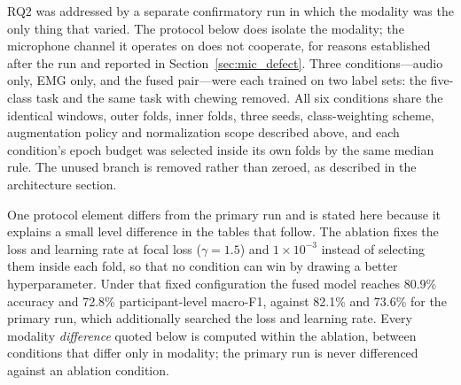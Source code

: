 \documentclass[pdflatex,sn-nature,iicol]{sn-jnl}
\begin{document}
RQ2 was addressed by a separate confirmatory run in which the modality was the only thing that varied. The protocol below does isolate the modality; the microphone channel it operates on does not cooperate, for reasons established after the run and reported in Section~\ref{sec:mic_defect}. Three conditions---audio only, EMG only, and the fused pair---were each trained on two label sets: the five-class task and the same task with chewing removed. All six conditions share the identical windows, outer folds, inner folds, three seeds, class-weighting scheme, augmentation policy and normalization scope described above, and each condition's epoch budget was selected inside its own folds by the same median rule. The unused branch is removed rather than zeroed, as described in the architecture section.

One protocol element differs from the primary run and is stated here because it explains a small level difference in the tables that follow. The ablation fixes the loss and learning rate at focal loss ($\gamma = 1.5$) and $1\times10^{-3}$ instead of selecting them inside each fold, so that no condition can win by drawing a better hyperparameter. Under that fixed configuration the fused model reaches 80.9\% accuracy and 72.8\% participant-level macro-F1, against 82.1\% and 73.6\% for the primary run, which additionally searched the loss and learning rate. Every modality \emph{difference} quoted below is computed within the ablation, between conditions that differ only in modality; the primary run is never differenced against an ablation condition.
\end{document}
